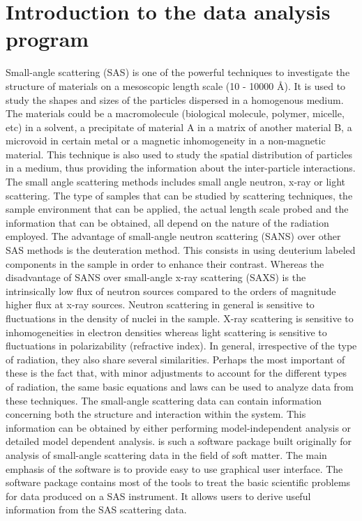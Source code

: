 \chapter{Introduction to the data analysis program \SASfit}

Small-angle scattering (SAS) is one of the powerful techniques to
investigate the structure of materials on a mesoscopic length scale
(10 - 10000 {\AA}). It is used to study the shapes and sizes of the
particles dispersed in a homogenous medium. The materials could be a
macromolecule (biological molecule, polymer, micelle, etc) in a
solvent, a precipitate of material A in a matrix of another material
B, a microvoid in certain metal or a magnetic inhomogeneity in a
non-magnetic material. This technique is also used to study the
spatial distribution of particles in a medium, thus providing the
information about the inter-particle interactions. The small angle
scattering methods includes small angle neutron, x-ray or light
scattering. The type of samples that can be studied by scattering
techniques, the sample environment that can be applied, the actual
length scale probed and the information that can be obtained, all
depend on the nature of the radiation employed. The advantage of
small-angle neutron scattering (SANS) over other SAS methods is the
deuteration method. This consists in using deuterium labeled
components in the sample in order to enhance their contrast. Whereas
the disadvantage of SANS over small-angle x-ray scattering (SAXS) is
the intrinsically low flux of neutron sources compared to the orders
of magnitude higher flux at x-ray sources. Neutron scattering in
general is sensitive to fluctuations in the density of nuclei in the
sample. X-ray scattering is sensitive to inhomogeneities in electron
densities whereas light scattering is sensitive to fluctuations in
polarizability (refractive index). In general, irrespective of the
type of radiation, they also share several similarities. Perhaps the
most important of these is the fact that, with minor adjustments to
account for the different types of radiation, the same basic
equations and laws can be used to analyze data from these
techniques. The small-angle scattering data can contain information
concerning both the structure and interaction within the system. This
information can be obtained by either performing model-independent
analysis or detailed model dependent analysis. \SASfit is such a
software package built originally for analysis of small-angle scattering data
in the field of soft matter. The main emphasis of the
software is to provide easy to use graphical user interface.
The software package contains most of
the tools to treat the basic scientific problems for
data produced on a SAS instrument. It allows users to
derive useful information from the SAS scattering data.

